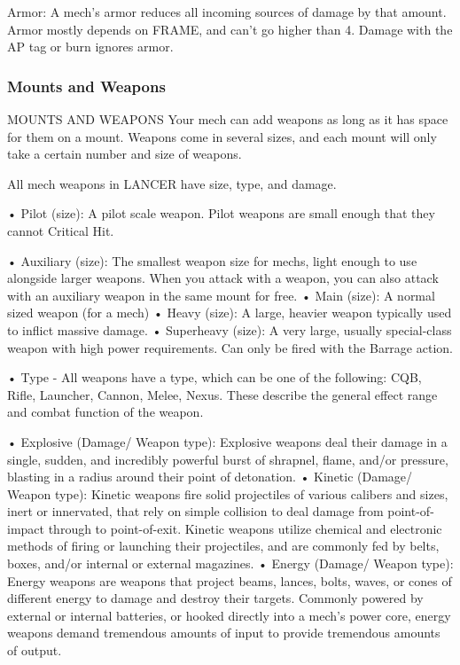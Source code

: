 Armor: A mech’s armor reduces all incoming sources of damage by that amount. Armor mostly
depends on FRAME, and can’t go higher than 4. Damage with the AP tag or burn ignores armor.

\subsubsection{Mounts and Weapons}
                                   MOUNTS AND WEAPONS
Your mech can add weapons as long as it has space for them on a mount. Weapons come in
several sizes, and each mount will only take a certain number and size of weapons.


All mech weapons in LANCER have size, type, and damage.




•  Pilot (size): A pilot scale weapon. Pilot weapons are small enough that they cannot Critical Hit.

•  Auxiliary (size): The smallest weapon size for mechs, light enough to use alongside larger
  weapons. When you attack with a weapon, you can also attack with an auxiliary weapon in the
  same mount for free.
•  Main (size): A normal sized weapon (for a mech)
•  Heavy (size): A large, heavier weapon typically used to inflict massive damage.
•  Superheavy (size): A very large, usually special-class weapon with high power requirements.
  Can only be fired with the Barrage action.

•  Type - All weapons have a type, which can be one of the following: CQB, Rifle, Launcher,
  Cannon, Melee, Nexus. These describe the general effect range and combat function of the
  weapon.


•  Explosive (Damage/ Weapon type): Explosive weapons deal their damage in a single,
  sudden, and incredibly powerful burst of shrapnel, flame, and/or pressure, blasting in a radius
  around their point of detonation.
•  Kinetic (Damage/ Weapon type): Kinetic weapons fire solid projectiles of various calibers and
  sizes, inert or innervated, that rely on simple collision to deal damage from point-of-impact
  through to point-of-exit. Kinetic weapons utilize chemical and electronic methods of firing or
  launching their projectiles, and are commonly fed by belts, boxes, and/or internal or external
  magazines.
•  Energy (Damage/ Weapon type): Energy weapons are weapons that project beams, lances,
  bolts, waves, or cones of different energy to damage and destroy their targets. Commonly
  powered by external or internal batteries, or hooked directly into a mech’s power core, energy
  weapons demand tremendous amounts of input to provide tremendous amounts of output.


